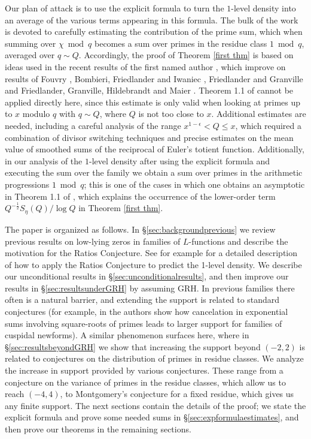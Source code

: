 \documentclass[12pt,reqno]{amsart}
\numberwithin{equation}{section}
\theoremstyle{plain}
\begin{document}
Our plan of attack is to use the explicit formula to turn the $1$-level density into an average of the various terms appearing in this formula. The bulk of the work is devoted to carefully estimating the contribution of the prime sum, which when summing over $\chi \bmod q$ becomes a sum over primes in the residue class $1 \bmod q$, averaged over $q\sim Q$. Accordingly, the proof of Theorem \ref{first thm} is based on ideas used in the recent results of the first named author \cite{fiorilli}, which improve on results of Fouvry \cite{fouvry}, Bombieri, Friedlander and Iwaniec \cite{BFI}, Friedlander and Granville \cite{FG} and Friedlander, Granville, Hildebrandt and Maier \cite{FGHM}. Theorem 1.1 of \cite{fiorilli} cannot be applied directly here, since this estimate is only valid when looking at primes up to $x$ modulo $q$ with $q\sim Q$, where $Q$ is not too close to $x$. Additional estimates are needed, including a careful analysis of the range $x^{1-\epsilon} < Q \leq x$, which required a combination of divisor switching techniques and precise estimates on the mean value of smoothed sums of the reciprocal of Euler's totient function. Additionally, in our analysis of the $1$-level density after using the explicit formula and executing the sum over the family we obtain a sum over primes in the arithmetic progressions $1\bmod q$; this is one of the cases in which one obtains an asymptotic in Theorem 1.1 of \cite{fiorilli}, which explains the occurrence of the lower-order term $Q^{-\frac 12} S_{\eta}(Q)/\log Q$ in Theorem \ref{first thm}.

The paper is organized as follows. In \S\ref{sec:backgroundprevious} we review previous results on low-lying zeros in families of $L$-functions and describe the motivation for the Ratios Conjecture. See for example \cite{GJMMNPP, Mil4} for a detailed description of how to apply the Ratios Conjecture to predict the 1-level density. We describe our unconditional results in \S\ref{sec:unconditionalresults}, and then improve our results in \S\ref{sec:resultsunderGRH} by assuming GRH. In previous families there often is a natural barrier, and extending the support is related to standard conjectures (for example, in \cite{ILS} the authors show  how cancelation in exponential sums involving square-roots of primes leads to larger support for families of cuspidal newforms). A similar phenomenon surfaces here, where in \S\ref{sec:resultsbeyondGRH} we show that increasing the support beyond $(-2,2)$ is related to conjectures on the distribution of primes in residue classes. We analyze the increase in support provided by various conjectures. These range from a conjecture on the variance of primes in the residue classes, which allow us to reach $(-4, 4)$, to Montgomery's conjecture for a fixed residue, which gives us any finite support. The next sections contain the details of the proof; we state the explicit formula and prove some needed sums in \S\ref{sec:expformulaestimates}, and then prove our theorems in the remaining sections.
\end{document}
